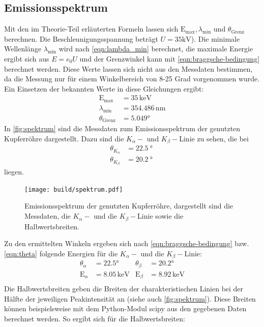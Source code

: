 \subsection{Emissionsspektrum}
Mit den im Theorie-Teil erläuterten Formeln lassen sich $\text{E}_\text{max}, \lambda_\text{min}$ und $\theta_\text{Grenz}$ berechnen. Die Beschleunigungsspannung beträgt $U=35 \si{\kilo\volt}$). Die minimale Wellenlänge $\lambda_\text{min}$ wird nach \autoref{eqn:lambda_min} berechnet, die maximale Energie ergibt sich aus $E = e_0 U$ und der Grenzwinkel kann mit \autoref{eqn:braggsche-bedingung} berechnet werden. Diese Werte lassen sich nicht aus den Messdaten bestimmen, da die Messung nur für einem Winkelbereich von 8-25 Grad vorgenommen wurde. Ein Einsetzen der bekannten Werte in diese Gleichungen ergibt:
\begin{align}
  \text{E}_\text{max} &= 35 \, \mathrm{keV}\\
  \lambda_\text{min} &= 354.486 \, \mathrm{nm}\\
  \theta_\text{Grenz} &= 5.049°
\end{align}
\noindent
In \autoref{fig:spektrum} sind die Messdaten zum Emissionsspektrum der genutzten Kupferröhre dargestellt. Dazu sind die $K_\alpha-$ und $K_\beta-$Linie zu sehen, die bei
\begin{align*}
    \theta_{K_\alpha} &= \SI{22.5}{\degree} \\
    \theta_{K_\beta}  &= \SI{20.2}{\degree} \; 
\end{align*}
liegen.
\begin{figure}[H]
  \centering
  \texttt{[image: build/spektrum.pdf]}
  \caption{Emissionsspektrum der genutzten Kupferröhre, dargestellt sind die Messdaten, die $K_\alpha-$ und die $K_\beta-$Linie sowie die Halbwertsbreiten.}
  \label{fig:spektrum}
\end{figure}
\noindent
Zu den ermittelten Winkeln ergeben sich nach \autoref{eqn:braggsche-bedingung} bzw. \autoref{eqn:theta} folgende Energien für die $K_\alpha-$ und die $K_\beta-$Linie:
\begin{align}
  \theta_\alpha&=22.5° & \theta_\beta&=20.2° \\
  \text{E}_\alpha&=8.05 \, \mathrm{keV}   &\text{E}_\beta&=8.92 \, \mathrm{keV} \\
\end{align}
  Die Halbwertsbreiten geben die Breiten der charakteristischen Linien bei der Hälfte der jeweiligen Peakintensität an (siehe auch \autoref{fig:spektrum}). Diese Breiten können beispielsweise mit dem Python-Modul scipy aus den gegebenen Daten berechnet werden. So ergibt sich für die Halbwertsbreiten:
